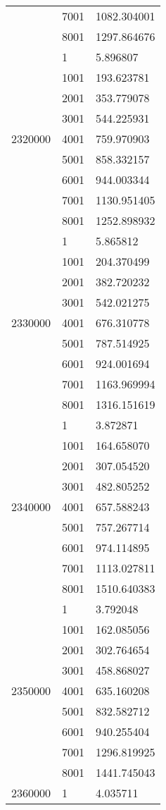 \begin{table}[htb!]
\begin{tabular}{lll}
 & 7001 & 1082.304001 \\
 & 8001 & 1297.864676 \\
\multirow[c]{9}{*}{2320000} & 1 & 5.896807 \\
 & 1001 & 193.623781 \\
 & 2001 & 353.779078 \\
 & 3001 & 544.225931 \\
 & 4001 & 759.970903 \\
 & 5001 & 858.332157 \\
 & 6001 & 944.003344 \\
 & 7001 & 1130.951405 \\
 & 8001 & 1252.898932 \\
\multirow[c]{9}{*}{2330000} & 1 & 5.865812 \\
 & 1001 & 204.370499 \\
 & 2001 & 382.720232 \\
 & 3001 & 542.021275 \\
 & 4001 & 676.310778 \\
 & 5001 & 787.514925 \\
 & 6001 & 924.001694 \\
 & 7001 & 1163.969994 \\
 & 8001 & 1316.151619 \\
\multirow[c]{9}{*}{2340000} & 1 & 3.872871 \\
 & 1001 & 164.658070 \\
 & 2001 & 307.054520 \\
 & 3001 & 482.805252 \\
 & 4001 & 657.588243 \\
 & 5001 & 757.267714 \\
 & 6001 & 974.114895 \\
 & 7001 & 1113.027811 \\
 & 8001 & 1510.640383 \\
\multirow[c]{9}{*}{2350000} & 1 & 3.792048 \\
 & 1001 & 162.085056 \\
 & 2001 & 302.764654 \\
 & 3001 & 458.868027 \\
 & 4001 & 635.160208 \\
 & 5001 & 832.582712 \\
 & 6001 & 940.255404 \\
 & 7001 & 1296.819925 \\
 & 8001 & 1441.745043 \\
\multirow[c]{9}{*}{2360000} & 1 & 4.035711 \\

\end{tabular}
\end{table}
